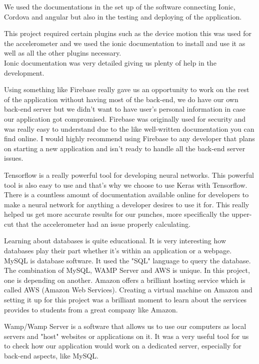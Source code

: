 \documentclass[a4paper,12pt]{report}
\begin{document}
We used the documentations in the set up of the software connecting Ionic, Cordova and angular but also in the testing and deploying of the application.

This project required certain plugins such as the device motion this was used for the accelerometer and we used the ionic documentation to install and use it as well as all the other plugins necessary.\\
Ionic documentation was very detailed giving us plenty of help in the development.

Using something like Firebase really gave us an opportunity to work on the rest of the application without having most of the back-end, we do have our own back-end server but we didn't want to have user's personal information in case our application got compromised. Firebase was originally used for security and was really easy to understand due to the like well-written documentation you can find online. I would highly recommend using Firebase to any developer that plans on starting a new application and isn't ready to handle all the back-end server issues.

Tensorflow is a really powerful tool for developing neural networks. This powerful tool is also easy to use and that's why we choose to use Keras with Tensorflow. There is a countless amount of documentation available online for developers to make a neural network for anything a developer desires to use it for. This really helped us get more accurate results for our punches, more specifically the upper-cut that the accelerometer had an issue properly calculating.

Learning about databases is quite educational. It is very interesting how databases play their part whether it's within an application or a webpage. MySQL is database software. It used the "SQL" language to query the database. The combination of MySQL, WAMP Server and AWS is unique. In this project, one is depending on another. Amazon offers a brilliant hosting service which is called AWS (Amazon Web Services). Creating a virtual machine on Amazon and setting it up for this project was a brilliant moment to learn about the services provides to students from a great company like Amazon.

Wamp/Wamp Server is a software that allows us to use our computers as local servers and "host" websites or applications on it. It was a very useful tool for us to check how our application would work on a dedicated server, especially for back-end aspects, like MySQL.
\end{document}
